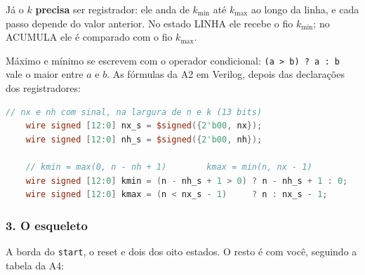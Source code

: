 \documentclass[11pt,a4paper,oneside]{article}
\begin{document}
Já o \(k\) \textbf{precisa} ser registrador: ele anda de \(k_{\min}\) até
\(k_{\max}\) ao longo da linha, e cada passo depende do valor anterior. No
estado LINHA ele recebe o fio \(k_{\min}\); no ACUMULA ele é comparado com
o fio \(k_{\max}\).

Máximo e mínimo se escrevem com o operador condicional:
\texttt{(a > b) ? a : b} vale o maior entre \(a\) e \(b\). As fórmulas da A2
em Verilog, depois das declarações dos registradores:
\begin{lstlisting}[language=Verilog]
    // nx e nh com sinal, na largura de n e k (13 bits)
    wire signed [12:0] nx_s = $signed({2'b00, nx});
    wire signed [12:0] nh_s = $signed({2'b00, nh});

    // kmin = max(0, n - nh + 1)        kmax = min(n, nx - 1)
    wire signed [12:0] kmin = (n - nh_s + 1 > 0) ? n - nh_s + 1 : 0;
    wire signed [12:0] kmax = (n < nx_s - 1)     ? n : nx_s - 1;
\end{lstlisting}

\subsubsection*{3. O esqueleto}

A borda do \texttt{start}, o reset e dois dos oito estados. O resto é com
você, seguindo a tabela da A4:
\end{document}
